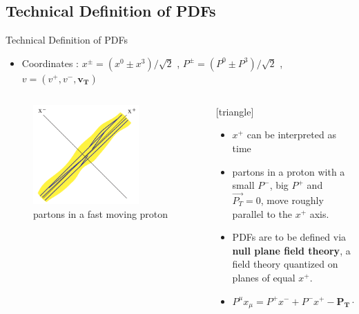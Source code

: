 \documentclass[aspectratio=169,xcolor=dvipsnames]{beamer}
\begin{document}
\subsection{Technical Definition of PDFs}
\begin{frame}{Technical Definition of PDFs}
	\begin{itemize}
		\item Coordinates : $x^\pm = (x^0 \pm x^3)/\sqrt{2}$ ,  $P^\pm = (P^0 \pm P^3)/\sqrt{2}$ , $v=(v^+,v^-,\mathbf{v_T})$
	\end{itemize}\vskip0.1in
	\begin{columns}[T]
		\begin{column}{.4\textwidth}
		\centering
			\begin{figure}
				\includegraphics[width=0.75\textwidth]{worldline.png}
				\caption{partons in a fast moving proton}
			\end{figure}
		\end{column}
		\begin{column}{.5\textwidth}
			[triangle]
			\begin{itemize}
				\item $x^+$ can be interpreted as time \vskip 0.15in
				\item partons in a proton with a small $P^-$, big $P^+$ and $\vec{P_T}=0$, move roughly parallel to the $x^+$ axis.\vskip0.15in
				\item PDFs are to be defined via \textbf{null plane field theory}, a field theory quantized on planes of equal $x^+$.
				\item $P^\mu x_\mu = P^+ x^- +P^- x^+ - \mathbf{P_T}\cdot \mathbf{x_T}$\vskip0.15in
			\end{itemize}
		\end{column}
	\end{columns}
\end{frame}
\end{document}
